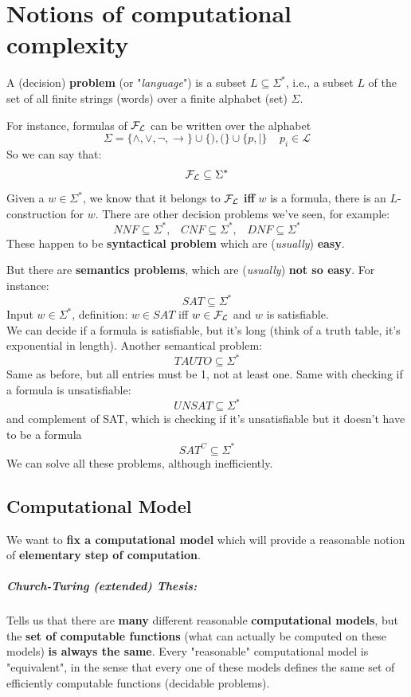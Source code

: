 
\chapter{Notions of computational complexity}

	\begin{definition} A (decision) \textbf{problem} (or "\textit{language}") is a subset $L \subseteq \Sigma^\ast$, i.e., a subset $L$ of the set of all finite strings (words) over a finite alphabet (set) $\Sigma$.
	\end{definition}

	\noindent
	For instance, formulas of $\mathcal{F}_\mathcal{L}$ can be written over the alphabet
	$$ \Sigma = \{\wedge, \vee, \neg, \rightarrow\} \cup \{),(\} \cup \{p, |\} \;\;\;\; p_i \in \mathcal{L} $$
	So we can say that:
	$$ \mathcal{F}_\mathcal{L} \subseteq \Sigma^\ast $$
	Given a $w \in \Sigma^\ast$, we know that it belongs to $\mathcal{F}_\mathcal{L}$ \textbf{iff} $w$ is a formula, there is an $L$-construction for $w$. There are other decision problems we've seen, for example:
	$$ NNF \subseteq \Sigma^\ast,  \;\;\; CNF \subseteq \Sigma^\ast,  \;\;\; DNF \subseteq \Sigma^\ast $$
	These happen to be \textbf{syntactical problem} which are (\textit{usually}) \textbf{easy}.

	But there are \textbf{semantics problems}, which are (\textit{usually}) \textbf{not so easy}. For instance:
	$$ SAT \subseteq \Sigma^\ast$$
	Input $w \in \Sigma^\ast$, definition: $w \in SAT$ iff $w \in \mathcal{F}_\mathcal{L}$ and $w$ is satisfiable.\\
	We can decide if a formula is satisfiable, but it's long (think of a truth table, it's exponential in length). Another semantical problem:
	$$ TAUTO \subseteq \Sigma^\ast$$
	Same as before, but all entries must be 1, not  at least one. Same with checking if a formula is unsatisfiable:
	$$ UNSAT \subseteq \Sigma^\ast $$
	and complement of SAT, which is checking if it's unsatisfiable but it doesn't have to be a formula
	$$ SAT^C \subseteq \Sigma^\ast $$
	We can solve all these problems, although inefficiently.

	\section{Computational Model}
	We want to \textbf{fix a computational model} which will provide a reasonable notion of \textbf{elementary step of computation}.
	\paragraph{Church-Turing (extended) Thesis:} Tells us that there are \textbf{many} different reasonable \textbf{computational models}, but the \textbf{set of computable functions} (what can actually be computed on these models) \textbf{is always the same}. Every "reasonable" computational model is "equivalent", in the sense that every one of these models defines the same set of efficiently computable functions (decidable problems).\\

